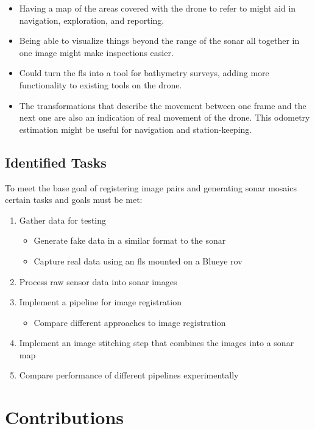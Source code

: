 \begin{itemize}
    \item Having a map of the areas covered with the drone to refer to might aid in navigation, exploration, and reporting.
    \item Being able to visualize things beyond the range of the \acrshort{sonar} all together in one image might make inspections easier.
    \item Could turn the \acrshort{fls} into a tool for bathymetry surveys, adding more functionality to existing tools on the drone.
    \item The transformations that describe the movement between one frame and the next one are also an indication of real movement of the drone. This odometry estimation might be useful for navigation and station-keeping.
\end{itemize}

\subsection{Identified Tasks}
To meet the base goal of registering image pairs and generating \acrshort{sonar} mosaics certain tasks and goals must be met:

\begin{enumerate}
    \item Gather data for testing
        \begin{itemize}
            \item Generate fake data in a similar format to the \acrshort{sonar}
            \item Capture real data using an \acrshort{fls} mounted on a Blueye \acrshort{rov}
        \end{itemize}
    \item Process raw sensor data into \acrshort{sonar} images
    \item Implement a pipeline for image registration
        \begin{itemize}
            \item Compare different approaches to image registration
        \end{itemize}
    \item Implement an image stitching step that combines the images into a \acrshort{sonar} map
    \item Compare performance of different pipelines experimentally
\end{enumerate}

\section{Contributions}

